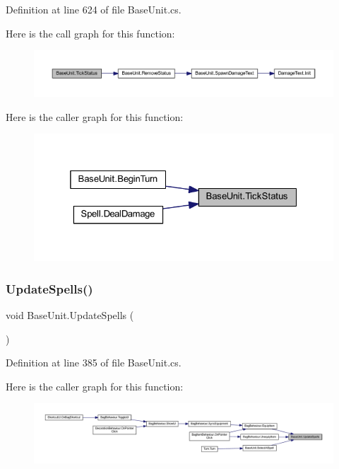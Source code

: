 Definition at line 624 of file Base\+Unit.\+cs.

Here is the call graph for this function\+:
\nopagebreak
\begin{figure}[H]
\begin{center}
\leavevmode
\includegraphics[width=350pt]{class_base_unit_af140c1094709a0a90f84d52a4ee80d90_cgraph}
\end{center}
\end{figure}
Here is the caller graph for this function\+:
\nopagebreak
\begin{figure}[H]
\begin{center}
\leavevmode
\includegraphics[width=325pt]{class_base_unit_af140c1094709a0a90f84d52a4ee80d90_icgraph}
\end{center}
\end{figure}
\mbox{\label{class_base_unit_a8b9c4263f81ef40c1841d26ee0573bce}} 
\subsubsection{\texorpdfstring{UpdateSpells()}{UpdateSpells()}}
{\footnotesize\ttfamily void Base\+Unit.\+Update\+Spells (\begin{DoxyParamCaption}{ }\end{DoxyParamCaption})}



Definition at line 385 of file Base\+Unit.\+cs.

Here is the caller graph for this function\+:
\nopagebreak
\begin{figure}[H]
\begin{center}
\leavevmode
\includegraphics[width=350pt]{class_base_unit_a8b9c4263f81ef40c1841d26ee0573bce_icgraph}
\end{center}
\end{figure}


